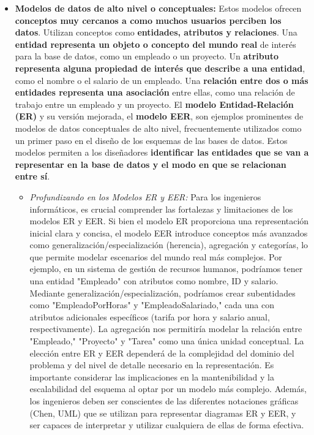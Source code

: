 \begin{itemize}
    \item \textbf{Modelos de datos de alto nivel o conceptuales:} Estos modelos ofrecen \textbf{conceptos muy cercanos a como muchos usuarios perciben los datos}. Utilizan conceptos como \textbf{entidades, atributos y relaciones}. Una \textbf{entidad representa un objeto o concepto del mundo real} de interés para la base de datos, como un empleado o un proyecto. Un \textbf{atributo representa alguna propiedad de interés que describe a una entidad}, como el nombre o el salario de un empleado. Una \textbf{relación entre dos o más entidades representa una asociación} entre ellas, como una relación de trabajo entre un empleado y un proyecto. El \textbf{modelo Entidad-Relación (ER)} y su versión mejorada, el \textbf{modelo EER}, son ejemplos prominentes de modelos de datos conceptuales de alto nivel, frecuentemente utilizados como un primer paso en el diseño de los esquemas de las bases de datos. Estos modelos permiten a los diseñadores \textbf{identificar las entidades que se van a representar en la base de datos y el modo en que se relacionan entre sí}.

    \begin{itemize}
    \item \textit{Profundizando en los Modelos ER y EER:} Para los ingenieros informáticos, es crucial comprender las fortalezas y limitaciones de los modelos ER y EER. Si bien el modelo ER proporciona una representación inicial clara y concisa, el modelo EER introduce conceptos más avanzados como generalización/especialización (herencia), agregación y categorías, lo que permite modelar escenarios del mundo real más complejos. Por ejemplo, en un sistema de gestión de recursos humanos, podríamos tener una entidad "Empleado" con atributos como nombre, ID y salario. Mediante generalización/especialización, podríamos crear subentidades como "EmpleadoPorHoras" y "EmpleadoSalariado," cada una con atributos adicionales específicos (tarifa por hora y salario anual, respectivamente). La agregación nos permitiría modelar la relación entre "Empleado," "Proyecto" y "Tarea" como una única unidad conceptual.  La elección entre ER y EER dependerá de la complejidad del dominio del problema y del nivel de detalle necesario en la representación. Es importante considerar las implicaciones en la mantenibilidad y la escalabilidad del esquema al optar por un modelo más complejo.  Además,  los ingenieros deben ser conscientes de las diferentes notaciones gráficas (Chen, UML) que se utilizan para representar diagramas ER y EER, y ser capaces de interpretar y utilizar cualquiera de ellas de forma efectiva.
    \end{itemize}


\end{itemize}
